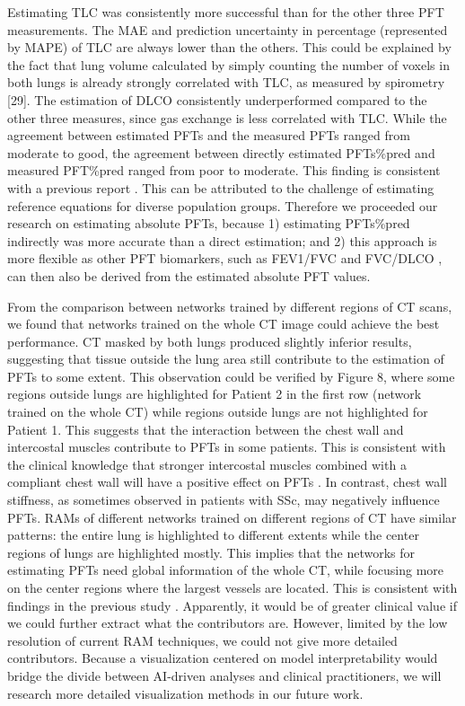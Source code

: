 Estimating TLC was consistently more successful than for the other three PFT measurements. The MAE and prediction uncertainty in percentage (represented by MAPE) of TLC are always lower than the others. This could be explained by the fact that lung volume calculated by simply counting the number of voxels in both lungs is already strongly correlated with TLC, as measured by spirometry [29]. The estimation of DLCO consistently underperformed compared to the other three measures, since gas exchange is less correlated with TLC.
While the agreement between estimated PFTs and the measured PFTs ranged from moderate to good, the agreement between directly estimated PFTs\%pred and measured PFT\%pred ranged from poor to moderate. This finding is consistent with a previous report \cite{Park2023}. This can be attributed to the challenge of estimating reference equations for diverse population groups. Therefore we proceeded our research on estimating absolute PFTs, because 1) estimating PFTs\%pred indirectly was more accurate than a direct estimation; and 2) this approach is more flexible as other PFT biomarkers, such as FEV1/FVC \cite{Behr2008} and FVC/DLCO \cite{vallejos2020association}, can then also be derived from the estimated absolute PFT values.

From the comparison between networks trained by different regions of CT scans, we found that networks trained on the whole CT image could achieve the best performance. CT masked by both lungs produced slightly inferior results, suggesting that tissue outside the lung area still contribute to the estimation of PFTs to some extent. This observation could be verified by Figure 8, where some regions outside lungs are highlighted for Patient 2 in the first row (network trained on the whole CT) while regions outside lungs are not highlighted for Patient 1. This suggests that the interaction between the chest wall and intercostal muscles  contribute to PFTs in some patients. This is consistent with the clinical knowledge that stronger intercostal muscles combined with a compliant chest wall will have a positive effect on PFTs \cite{Park2020}. In contrast, chest wall stiffness, as sometimes observed in patients with SSc, may negatively influence PFTs. RAMs of different networks trained on different regions of CT have similar patterns: the entire lung is highlighted to different extents while the center regions of lungs are highlighted mostly. This implies that the networks for estimating PFTs need global information of the whole CT, while focusing more on the center regions where the largest vessels are located. This is consistent with findings in the previous study \cite{Park2023}. Apparently, it would be of greater clinical value if we could further extract what the contributors are. However, limited by the low resolution of current RAM techniques, we could not give more detailed contributors. Because a visualization centered on model interpretability would bridge the divide between AI-driven analyses and clinical practitioners, we will research more detailed visualization methods in our future work.

